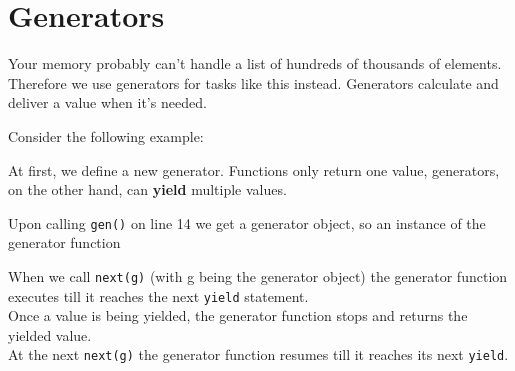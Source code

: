 \section{Generators}
    Your memory probably can't handle a list of hundreds of thousands of elements.
    Therefore we use generators for tasks like this instead.
    Generators calculate and deliver a value when it's needed.

    Consider the following example:


    At first, we define a new generator.
    Functions only return one value, generators, on the other hand, can
    \textbf{yield} multiple values.

    Upon calling \texttt{gen()} on line 14 we get a generator object, so an instance
    of the generator function

    When we call \texttt{next(g)} (with g being the generator object) the generator
    function executes till it reaches the next \texttt{yield} statement.\\
    Once a value is being yielded, the generator function stops and returns
    the yielded value.\\
    At the next \texttt{next(g)} the generator function resumes till it reaches
    its next \texttt{yield}.
